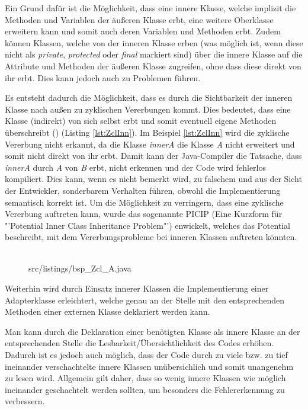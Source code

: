 Ein Grund dafür ist die Möglichkeit, dass eine innere Klasse, welche implizit die Methoden und Variablen der äußeren Klasse erbt, eine weitere Oberklasse erweitern kann und somit auch deren Variablen und Methoden erbt.
Zudem können Klassen, welche von der inneren Klasse erben (was möglich ist, wenn diese nicht als {\it private}, {\it protected} oder {\it final} markiert sind) über die innere Klasse auf die Attribute und Methoden der äußeren Klasse zugreifen, ohne dass diese direkt von ihr erbt. Dies kann jedoch auch zu Problemen führen.

Es entsteht dadurch die Möglichkeit, dass es durch die Sichtbarkeit der inneren Klasse nach außen zu zyklischen Vererbungen kommt. Dies bedeutet, dass eine Klasse (indirekt) von sich selbst erbt und somit eventuell eigene Methoden überschreibt (\cite{DBLP:journals/corr/abs-1301-6260}) (Listing \ref{lst:ZclInn}).
Im Beispiel \ref{lst:ZclInn}  wird die zyklische Vererbung nicht erkannt, da die Klasse {\it innerA} die Klasse {\it A} nicht erweitert und somit nicht direkt von ihr erbt. Damit kann der Java-Compiler die Tatsache, dass {\it innerA} durch {\it A} von {\it B} erbt, nicht erkennen und der Code wird fehlerlos kompiliert.
Dies kann, wenn es nicht bemerkt wird, zu falschem und aus der Sicht der Entwickler, sonderbarem Verhalten führen, obwohl die Implementierung semantisch korrekt ist.
Um die Möglichkeit zu verringern, dass eine zyklische Vererbung auftreten kann, wurde das sogenannte PICIP (Eine Kurzform für "'Potential Inner Class Inheritance Problem"') enwickelt, welches das Potential beschreibt, mit dem Vererbungsprobleme bei inneren Klassen auftreten könnten.
\\
\\
\begin{figure}[hbt]
\lstset{language=Java}
 {src/listings/bsp_Zcl_A.java}
\end{figure}

Weiterhin wird durch Einsatz innerer Klassen die Implementierung einer Adapterklasse erleichtert, welche genau an der Stelle mit den entsprechenden Methoden einer externen Klasse deklariert werden kann.

Man kann durch die Deklaration einer benötigten Klasse als innere Klasse an der entsprechenden Stelle die Lesbarkeit/Übersichtlichkeit des Codes erhöhen.
Dadurch ist es jedoch auch möglich, dass der Code durch zu viele bzw. zu tief ineinander verschachtelte innere Klassen unübersichlich und somit unangenehm zu lesen wird.
Allgemein gilt daher, dass so wenig innere Klassen wie möglich ineinander geschachtelt werden sollten, um besonders die Fehlererkennung zu verbessern.

